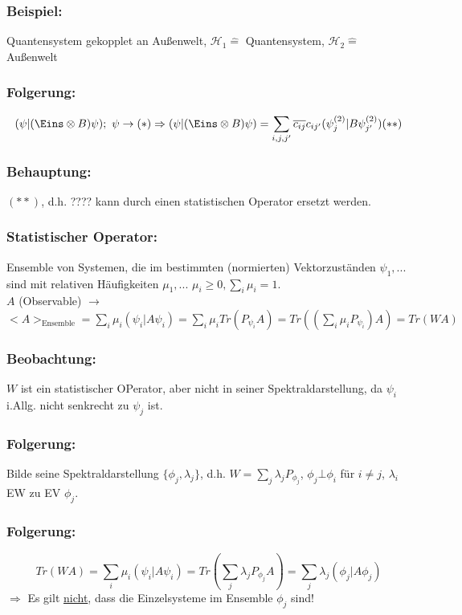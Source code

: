 \documentclass[twoside,a4paper]{scrartcl}
\renewcommand{\1}{\mathds{1}}
\newcommand{\Ra}{\Rightarrow}
\newcommand{\ra}{\rightarrow}
\renewcommand{\l}{\lambda}
\renewcommand{\H}{\mathcal{H}}
\begin{document}
\subsubsection*{Beispiel:}
Quantensystem gekopplet an Außenwelt, $\H_1 \mathrel{\widehat{=}}$ Quantensystem, $\H_2\mathrel{\widehat{=}}$ Außenwelt
\subsubsection*{Folgerung:}
$$(\psi|(\Eins\otimes B)\psi); \ \psi \ra (*) \Ra (\psi|(\Eins\otimes B)\psi)=\sum_{i,j,j'} \overline{c_{ij}}c_{ij'}(\psi_j^{(2)}|B \psi_{j'}^{(2)}) (**)$$
\subsubsection*{Behauptung:} 
$(**)$, d.h. ???? kann durch einen statistischen Operator ersetzt werden.
\subsubsection*{Statistischer Operator:} 
Ensemble von Systemen, die im bestimmten (normierten) Vektorzuständen $\psi_1,...$ sind mit relativen Häufigkeiten $\mu_1,...$ $\mu_i\geq 0, \sum_i \mu_i=1$.\\
$A$ (Observable) $\ra$ $<A>_{\mathrm{Ensemble}}=\sum_i \mu_i (\psi_i|A\psi_i)=\sum_i \mu_i Tr(P_{\psi_i}A)=Tr((\sum_i \mu_i P_{\psi_i})A)=Tr(WA)$
\subsubsection*{Beobachtung:} 
$W$ ist ein statistischer OPerator, aber nicht in seiner Spektraldarstellung, da $\psi_i$ i.Allg. nicht senkrecht zu $\psi_j$ ist.
\subsubsection*{Folgerung:} 
Bilde seine Spektraldarstellung $\{\phi_j,\l_j\}$, d.h. $W=\sum_j \l_j P_{\phi_j}$, $\phi_j \bot \phi_i$ für $i\neq j$, $\l_i$ EW zu EV $\phi_j$.
\subsubsection*{Folgerung:} 
$$Tr(WA)=\sum_i \mu_i (\psi_i|A\psi_i)=Tr(\sum_j \l_j P_{\phi_j}A)=\sum_j \l_j (\phi_j|A\phi_j)$$
$\Ra$ Es gilt \underline{nicht}, dass die Einzelsysteme im Ensemble $\phi_j$ sind!
\end{document}
